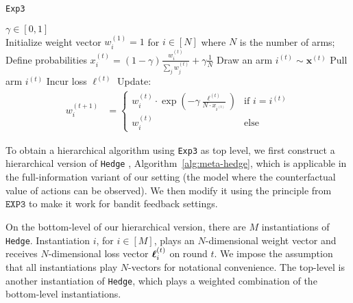 \begin{algorithm}
   \caption{\texttt{Exp3}}
   \label{alg:exp3}
   \begin{algorithmic}  
       $\gamma\in[0,1]$\\
   \STATE Initialize weight vector $w^{(1)}_{i}=1$ for $i\in[N]$ where $N$ is the number of arms;
	   \STATE Define probabilities $x_i^{(t)} = (1-\gamma)\frac{w_i^{(t)}}{ \sum_j w_{j}^{(t)} } + \gamma\frac{1}{N}$
	   \STATE Draw an arm $i^{(t)} \sim\mathbf{x}^{(t)}$
	\STATE Pull arm $i^{(t)} $
	   \STATE Incur loss $\ell^{(t)}$
	   \STATE Update:
	   \begin{align}
		w^{(t+1)}_i & = \begin{cases}
		   w_{i}^{(t)} \cdot \exp(-\gamma \frac{\ell^{(t)}}{N\cdot x_{i^{(t)}}})
			 & \text{if } i=i^{(t)} \\
			w^{(t)}_{i} & \text{else}
		\end{cases}		
		\end{align}
    \ENDFOR
       	\end{algorithmic}
\end{algorithm}         
 
To obtain a hierarchical algorithm using \texttt{Exp3} as top level, we first construct a hierarchical version of \texttt{Hedge} \citep{littlestone1994weighted, freund1997decision}, Algorithm~\ref{alg:meta-hedge}, which is applicable in the full-information variant of our setting (the model where the counterfactual value of actions can be observed). We then modify it using the principle from $\texttt{EXP3}$ to make it work for bandit feedback settings.

On the bottom-level of our hierarchical version, there are $M$ instantiations of \texttt{Hedge}. Instantiation $i$, for $i\in[M]$, plays an $N$-dimensional weight vector and receives $N$-dimensional loss vector $\boldsymbol\ell^{(t)}_{i}$ on round $t$. We impose the assumption that all instantiations play $N$-vectors for notational convenience. The top-level is another instantiation of \texttt{Hedge}, which plays a weighted combination of the bottom-level instantiations.

